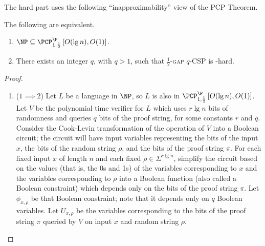 \documentclass[]{article}
\newcommand{\PCPcs}[5]{\PCP^{#1}_{#2, #3}\left[#4, #5\right]}
\begin{document}
The hard part uses the following ``inapproximability'' view of the PCP Theorem.
\begin{proposition}
  The following are equivalent.
  \begin{enumerate}
  \item $\NP \subseteq \PCPcs{\P}{1}{\frac{1}{2}}{O(\lg n)}{O(1)}$.
  \item There exists an integer $q$, with $q > 1$, such that \textsc{$\frac{1}{2}$-gap $q$-CSP} is \NP-hard.
  \end{enumerate}
\end{proposition}
\begin{proof}
  \mbox{}
  \begin{enumerate}
  \item ($1 \implies 2$)
    Let $L$ be a language in $\NP$, so $L$ is also in $\PCPcs{\P}{1}{\frac{1}{2}}{O(\lg n)}{O(1)}$.
    Let $V$ be the polynomial time \PCP{} verifier for $L$ which uses $r \lg n$ bits of randomness and queries $q$ bits of the proof string, for some constants $r$ and $q$.
    Consider the Cook-Levin transformation of the operation of $V$ into a Boolean circuit; the circuit will have input variables representing the bits of the input $x$, the bits of the random string $\rho$, and the bits of the proof string $\pi$.
    For each fixed input $x$ of length $n$ and each fixed $\rho \in \Sigma^{r \lg n}$, simplify the circuit based on the values (that is, the 0s and 1s) of the variables corresponding to $x$ and the variables corresponding to $\rho$ into a Boolean function (also called a Boolean constraint) which depends only on the bits of the proof string $\pi$.
    Let $\phi_{x, \rho}$ be that Boolean constraint; note that it depends only on $q$ Boolean variables.
    Let $U_{x, \rho}$ be the variables corresponding to the bits of the proof string $\pi$ queried by $V$ on input $x$ and random string $\rho$.


\end{enumerate}
\end{proof}
\end{document}
